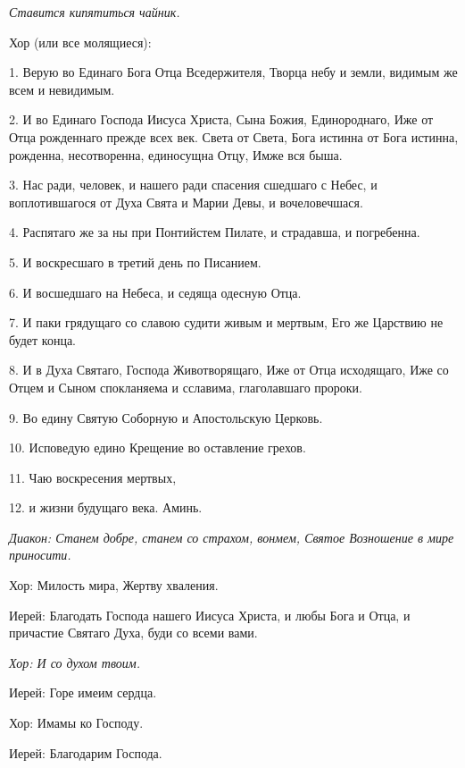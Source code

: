  


\itshape  Ставится кипятиться чайник\normalfont{}. 




  Хор (или все молящиеся):


  1. Верую во Единаго Бога Отца Вседержителя, Творца небу и земли, видимым же всем и невидимым. 


  2. И во Единаго Господа Иисуса Христа, Сына Божия, Единороднаго, Иже от Отца рожденнаго прежде всех век. Света от Света, Бога истинна от Бога истинна, рожденна, несотворенна, единосущна Отцу, Имже вся быша.


  3. Нас ради, человек, и нашего ради спасения сшедшаго с Небес, и воплотившагося от Духа Свята и Марии Девы, и вочеловечшася.


  4. Распятаго же за ны при Понтийстем Пилате, и страдавша, и погребенна.


  5. И воскресшаго в третий день по Писанием.


  6. И восшедшаго на Небеса, и седяща одесную Отца.


  7. И паки грядущаго со славою судити живым и мертвым, Его же Царствию не будет конца.


  8. И в Духа Святаго, Господа Животворящаго, Иже от Отца исходящаго, Иже со Отцем и Сыном спокланяема и сславима, глаголавшаго пророки.


  9. Во едину Святую Соборную и Апостольскую Церковь.


  10. Исповедую едино Крещение во оставление грехов.


  11. Чаю воскресения мертвых,


  12. и жизни будущаго века. Аминь. 




\itshape  Диакон:\normalfont{} Станем добре, станем со страхом, вонмем, Святое Возношение в мире приносити\itshape . 


  Хор:\normalfont{} Милость мира, Жертву хваления. \itshape 


  Иерей:\normalfont{} Благодать Господа нашего Иисуса Христа, и любы Бога и Отца, и причастие Святаго Духа, буди со всеми вами.


\itshape Хор:\normalfont{} И со духом твоим. \itshape 


  Иерей:\normalfont{} Горе имеим сердца. \itshape 


  Хор:\normalfont{} Имамы ко Господу. \itshape 


  Иерей:\normalfont{} Благодарим Господа. \itshape 


